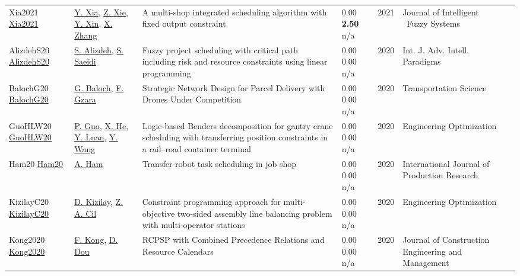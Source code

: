 {\begin{longtable}{p{3cm}p{5cm}p{10cm}p{1cm}rp{2.5cm}l}
Xia2021 \href{http://dx.doi.org/10.3233/jifs-189721}{Xia2021} & \hyperref[auth:a1538]{Y. Xia}, \hyperref[auth:a1539]{Z. Xie}, \hyperref[auth:a1540]{Y. Xin}, \hyperref[auth:a1541]{X. Zhang} & A multi-shop integrated scheduling algorithm with fixed output constraint & \noindent{}\textcolor{black!50}{0.00} \textbf{2.50} n/a & 2021 & Journal of Intelligent \  Fuzzy Systems & \cite{Xia2021}\\
AlizdehS20 \href{https://doi.org/10.1504/IJAIP.2020.106687}{AlizdehS20} & \hyperref[auth:a512]{S. Alizdeh}, \hyperref[auth:a513]{S. Saeidi} & Fuzzy project scheduling with critical path including risk and resource constraints using linear programming & \noindent{}\textcolor{black!50}{0.00} \textcolor{black!50}{0.00} n/a & 2020 & \cellcolor{red!20}Int. J. Adv. Intell. Paradigms & \cite{AlizdehS20}\\
BalochG20 \href{http://dx.doi.org/10.1287/trsc.2019.0928}{BalochG20} & \hyperref[auth:a1236]{G. Baloch}, \hyperref[auth:a1237]{F. Gzara} & Strategic Network Design for Parcel Delivery with Drones Under Competition & \noindent{}\textcolor{black!50}{0.00} \textcolor{black!50}{0.00} n/a & 2020 & \cellcolor{red!20}Transportation Science & \cite{BalochG20}\\
GuoHLW20 \href{http://dx.doi.org/10.1080/0305215x.2019.1699919}{GuoHLW20} & \hyperref[auth:a930]{P. Guo}, \hyperref[auth:a931]{X. He}, \hyperref[auth:a932]{Y. Luan}, \hyperref[auth:a933]{Y. Wang} & Logic-based Benders decomposition for gantry crane scheduling with transferring position constraints in a rail–road container terminal & \noindent{}\textcolor{black!50}{0.00} \textcolor{black!50}{0.00} n/a & 2020 & \cellcolor{red!20}Engineering Optimization & \cite{GuoHLW20}\\
Ham20 \href{http://dx.doi.org/10.1080/00207543.2019.1709671}{Ham20} & \hyperref[auth:a749]{A. Ham} & Transfer-robot task scheduling in job shop & \noindent{}\textcolor{black!50}{0.00} \textcolor{black!50}{0.00} n/a & 2020 & \cellcolor{red!20}International Journal of Production Research & \cite{Ham20}\\
KizilayC20 \href{http://dx.doi.org/10.1080/0305215x.2020.1786081}{KizilayC20} & \hyperref[auth:a1379]{D. Kizilay}, \hyperref[auth:a1380]{Z. A. Cil} & Constraint programming approach for multi-objective two-sided assembly line balancing problem with multi-operator stations & \noindent{}\textcolor{black!50}{0.00} \textcolor{black!50}{0.00} n/a & 2020 & \cellcolor{red!20}Engineering Optimization & \cite{KizilayC20}\\
Kong2020 \href{http://dx.doi.org/10.1061/(asce)co.1943-7862.0001929}{Kong2020} & \hyperref[auth:a1704]{F. Kong}, \hyperref[auth:a1777]{D. Dou} & RCPSP with Combined Precedence Relations and Resource Calendars & \noindent{}\textcolor{black!50}{0.00} \textcolor{black!50}{0.00} n/a & 2020 & Journal of Construction Engineering and Management & \cite{Kong2020}\\

\end{longtable}}
